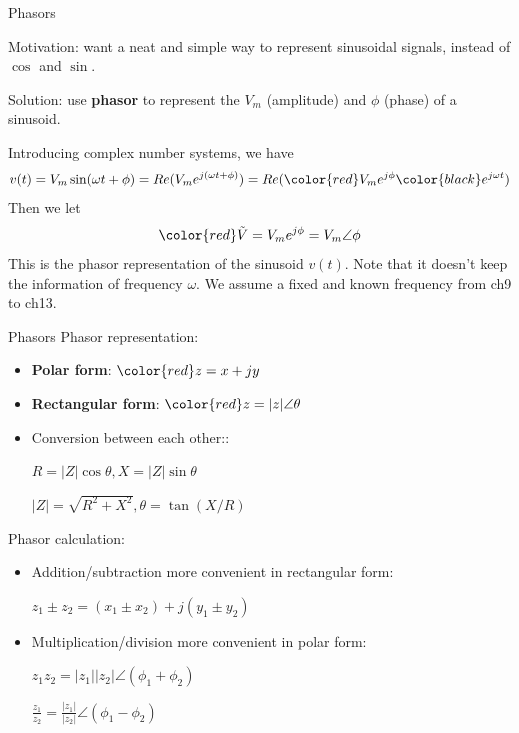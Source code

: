 \documentclass{beamer}
\begin{document}
\begin{frame}{Phasors}

Motivation: want a neat and simple way to represent sinusoidal signals, instead of $\cos$ and $\sin$.

Solution: use \textbf{phasor} to represent the $V_m$ (amplitude) and $\phi$ (phase) of a sinusoid.

\vspace{0.5cm}

Introducing complex number systems, we have
$$v(t) = V_m \sin(\omega t + \phi) = Re(V_me^{j(\omega t + \phi)}) = Re(\color{red}V_me^{j\phi}\color{black}e^{j\omega t})$$
Then we let
$${\color{red}\tilde{V} = V_me^{j\phi} = V_m \angle \phi}$$
This is the phasor representation of the sinusoid $v(t)$. Note that it doesn't keep the information of frequency $\omega$. We assume a fixed and known frequency from ch9 to ch13.

    
\end{frame}

\begin{frame}{Phasors}
Phasor representation:
\begin{itemize}
    \item \textbf{Polar form}: $\color{red}z = x + jy$
    \item \textbf{Rectangular form}: $\color{red}z = \vert z\vert \angle \theta$
    \item Conversion between each other::
    \begin{center}
    $R = \vert Z \vert \cos\theta, X = \vert Z \vert \sin \theta$
    
    $\vert Z \vert = \sqrt{R^2 + X^2}, \theta = \tan{(X/R)}$
    \end{center}
\end{itemize}

Phasor calculation:
\begin{itemize}
    \item Addition/subtraction more convenient in rectangular form:
    \begin{center}
        $z_1\pm z_2 = (x_1 \pm x_2) + j(y_1 \pm y_2)$
    \end{center}
    \item Multiplication/division more convenient in polar form:
    \begin{center}
        $z_1z_2 = \vert z_1 \vert \vert z_2\vert \angle (\phi_1 + \phi_2)$
        
        $\frac{z_1}{z_2} = \frac{\vert z_1 \vert}{ \vert z_2\vert}\angle (\phi_1 - \phi_2)$
        
    \end{center}
\end{itemize}

    
\end{frame}
\end{document}

